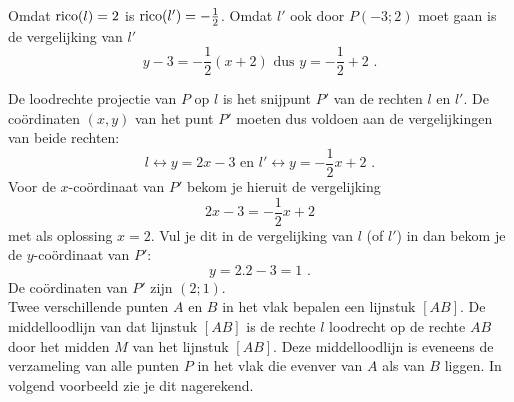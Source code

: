 \begin{voorbeeld}
Omdat $\operatorname{rico} (l)=2$ is $\operatorname{rico} (l')=-\frac{1}{2}$.
Omdat $l'$ ook door $P(-3;2)$ moet gaan is de vergelijking van $l'$
\[
y-3=-\frac{1}{2}(x+2) \text { dus } y=-\frac{1}{2}+2 \text { .}
\]

De loodrechte projectie van $P$ op $l$ is het snijpunt $P'$ van de rechten $l$ en $l'$.
De co\"ordinaten $(x,y)$ van het punt $P'$ moeten dus voldoen aan de vergelijkingen van beide rechten:
\[
l \leftrightarrow y=2x-3 \text { en } l' \leftrightarrow y=-\frac{1}{2}x+2 \text { .}
\]
Voor de $x$-co\"ordinaat van $P'$ bekom je hieruit de vergelijking
\[
2x-3=-\frac{1}{2}x+2
\]
met als oplossing $x=2$.
Vul je dit in de vergelijking van $l$ (of $l'$) in dan bekom je de $y$-co\"ordinaat van $P'$:
\[
y=2.2-3=1 \text { .}
\]
De co\"ordinaten van $P'$ zijn $(2;1)$.\\

Twee verschillende punten $A$ en $B$ in het vlak bepalen een lijnstuk $[AB]$.
De middelloodlijn van dat lijnstuk $[AB]$ is de rechte $l$ loodrecht op de rechte $AB$ door het midden $M$ van het lijnstuk $[AB]$.
Deze middelloodlijn is eveneens de verzameling van alle punten $P$ in het vlak die evenver van $A$ als van $B$ liggen.
In volgend voorbeeld zie je dit nagerekend.\\

\end{voorbeeld}

